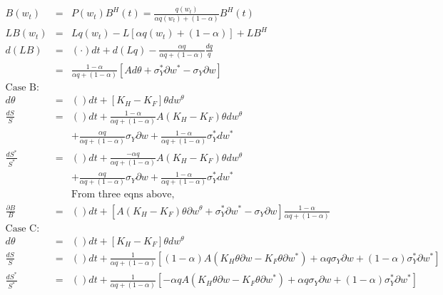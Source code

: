 \documentclass[]{article}
\begin{document}
\begin{eqnarray*}
B(w_t) &=& P(w_t) B^H(t) = \frac{q(w_t)}{\alpha q (w_t) + (1-\alpha)} B^H(t)\\
LB(w_t) &=& L q(w_t) - L[\alpha q (w_t) + (1-\alpha)] + LB^H\\
d(LB) &=& (\cdot) dt + d(Lq) - \frac{\alpha q}{\alpha q + (1-\alpha)} \frac{dq}{q}\\
&=& \frac{1-\alpha}{\alpha q + (1-\alpha)} [Ad\theta + \sigma_Y^* \partial w^* - \sigma_Y\partial w]\\
\mbox{Case B:} &&\\
d\theta &=& ()dt + [K_H - K_F]\theta dw^\theta\\
\frac{dS}{S} &=& ()dt + \frac{1-\alpha}{\alpha q + (1-\alpha)} A (K_H - K_F)\theta dw^\theta \\
&&+\frac{\alpha q}{\alpha q + (1-\alpha)} \sigma_Y \partial w + \frac{1-\alpha}{\alpha q + (1-\alpha)} \sigma_Y^* dw^*\\
\frac{dS^*}{S^*} &=& ()dt + \frac{-\alpha q}{\alpha q + (1-\alpha)} A (K_H - K_F)\theta dw^\theta \\
&&+\frac{\alpha q}{\alpha q + (1-\alpha)} \sigma_Y \partial w + \frac{1-\alpha}{\alpha q + (1-\alpha)} \sigma_Y^* dw^*\\
&& \mbox{From three eqns above,}\\
\frac{\partial B}{B} &=& ()dt + [A(K_H-K_F) \theta \partial w^\theta + \sigma_Y^* \partial w^* - \sigma_Y \partial w] \frac{1-\alpha}{\alpha q + (1-\alpha)}\\
\mbox{Case C:} &&\\
d\theta &=& ()dt + [K_H - K_F]\theta dw^\theta\\
\frac{dS}{S} &=& ()dt + \frac{1}{\alpha q + (1-\alpha)} \left[ (1-\alpha) A (K_H\theta \partial w - K_F \theta \partial w^*)+\alpha q \sigma_Y \partial w + (1-\alpha) \sigma_Y^* \partial w^* \right]\\
\frac{dS^*}{S^*} &=& ()dt + \frac{1}{\alpha q + (1-\alpha)} \left[ -\alpha q A (K_H\theta \partial w - K_F \theta \partial w^*)+\alpha q \sigma_Y \partial w + (1-\alpha) \sigma_Y^* \partial w^*\right]\\
\end{eqnarray*}
\end{document}

